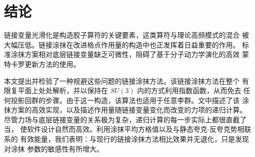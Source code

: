 \section{结论}
\label{sec:conclude}

链接变量光滑化是构造胶子算符的关键要素，这类算符与理论高频模式的混合
被大幅压低。链接涂抹在改进格点作用量的构造中也正发挥着日益重要的作用。
标准涂抹方案相对底层链接变量缺乏可微性，阻碍了基于分子动力学演化的高效
蒙特卡罗更新方法的使用。

本文提出并检验了一种规避这些问题的链接涂抹方法。该链接涂抹方法在整个
有限复平面上处处解析，并以保持在 $SU(3)$ 内的方式利用指数函数，从而免去
任何投影回群的步骤。由于这一构造，该算法也适用于任意李群。文中描述了该
涂抹方案的高效实现，以及描述作用量随链接变量变化而改变的力项的递归计算。
尽管力场与底层链接变量的关系极为复杂，递归计算的每一步实际上都很直截了当，
使软件设计自然而高效。利用涂抹平均方格值以及与静态夸克-反夸克势相联系的
有效能量，我们表明：与现行的链接涂抹方法相比效果并无退化，只是发现对涂抹
参数的敏感性有所增大。
